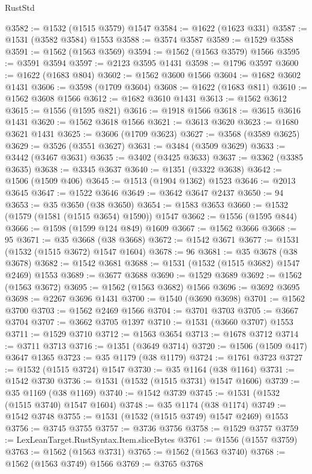 \begin{lexlean}{RustStd}
\begin{coremodule}
{\begin{coremodule}
{{{{{{{{{{{{{{{{{{{{{{{{{{{{{{{{@3582 := @1532 (@1515 @3579) @1547
@3584 := @1622 (@1623 @331)
@3587 := @1531 (@3582 @3584) @1553
@3588 := @3574 @3587
@3589 := @1529 @3588
@3591 := @1562 (@1563 @3569)
@3594 := @1562 (@1563 @3579) @1566
@3595 := @3591 @3594
@3597 := @2123 @3595 @1431
@3598 := @1796 @3597
@3600 := @1622 (@1683 @804)
@3602 := @1562 @3600 @1566
@3604 := @1682 @3602 @1431
@3606 := @3598 (@1709 @3604)
@3608 := @1622 (@1683 @811)
@3610 := @1562 @3608 @1566
@3612 := @1682 @3610 @1431
@3613 := @1562 @3612
@3615 := @1556 (@1595 @821)
@3616 := @1918 @1566
@3618 := @3615 @3616 @1431
@3620 := @1562 @3618 @1566
@3621 := @3613 @3620
@3623 := @1680 @3621 @1431
@3625 := @3606 (@1709 @3623)
@3627 := @3568 (@3589 @3625)
@3629 := @3526 (@3551 @3627)
@3631 := @3484 (@3509 @3629)
@3633 := @3442 (@3467 @3631)
@3635 := @3402 (@3425 @3633)
@3637 := @3362 (@3385 @3635)
@3638 := @3345 @3637
@3640 := @1351 (@3322 @3638)
@3642 := @1506 (@1509 @406)
@3645 := @1513 (@1904 @1362) @1523
@3646 := @2013 @3645
@3647 := @1522 @3646
@3649 := @3642 @3647 @2437
@3650 := 94
@3653 := @35 @3650 (@38 @3650)
@3654 := @1583 @3653
@3660 := @1532 (@1579 (@1581 (@1515 @3654) @1590)) @1547
@3662 := @1556 (@1595 @844)
@3666 := @1598 (@1599 @124 @849) @1609
@3667 := @1562 @3666
@3668 := 95
@3671 := @35 @3668 (@38 @3668)
@3672 := @1542 @3671
@3677 := @1531 (@1532 (@1515 @3672) @1547 @1604)
@3678 := 96
@3681 := @35 @3678 (@38 @3678)
@3682 := @1542 @3681
@3688 := @1531 (@1532 (@1515 @3682) @1547 @2469) @1553
@3689 := @3677 @3688
@3690 := @1529 @3689
@3692 := @1562 (@1563 @3672)
@3695 := @1562 (@1563 @3682) @1566
@3696 := @3692 @3695
@3698 := @2267 @3696 @1431
@3700 := @1540 (@3690 @3698)
@3701 := @1562 @3700
@3703 := @1562 @2469 @1566
@3704 := @3701 @3703
@3705 := @3667 @3704
@3707 := @3662 @3705 @1397
@3710 := @1531 (@3660 @3707) @1553
@3711 := @1529 @3710
@3712 := @1563 @3654
@3713 := @1678 @3712
@3714 := @3711 @3713
@3716 := @1351 (@3649 @3714)
@3720 := @1506 (@1509 @417) @3647 @1365
@3723 := @35 @1179 (@38 @1179)
@3724 := @1761 @3723
@3727 := @1532 (@1515 @3724) @1547
@3730 := @35 @1164 (@38 @1164)
@3731 := @1542 @3730
@3736 := @1531 (@1532 (@1515 @3731) @1547 @1606)
@3739 := @35 @1169 (@38 @1169)
@3740 := @1542 @3739
@3745 := @1531 (@1532 (@1515 @3740) @1547 @1604)
@3748 := @35 @1174 (@38 @1174)
@3749 := @1542 @3748
@3755 := @1531 (@1532 (@1515 @3749) @1547 @2469) @1553
@3756 := @3745 @3755
@3757 := @3736 @3756
@3758 := @1529 @3757
@3759 := LexLeanTarget.RustSyntax.Item.sliceBytes
@3761 := @1556 (@1557 @3759)
@3763 := @1562 (@1563 @3731)
@3765 := @1562 (@1563 @3740)
@3768 := @1562 (@1563 @3749) @1566
@3769 := @3765 @3768
}}}}}}}}}}}}}}}}}}}}}}}}}}}}}}}}
\end{coremodule}}
\end{coremodule}
\end{lexlean}
